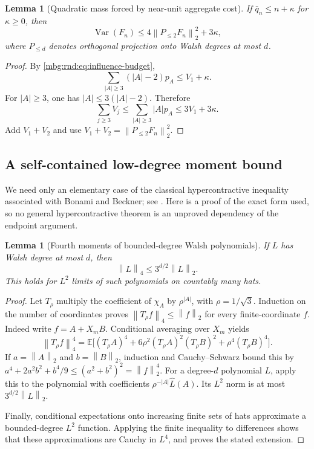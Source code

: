 \documentclass[11pt,letterpaper]{article}
\newtheorem{lemma}[theorem]{Lemma}
\theoremstyle{definition}
\newcommand{\E}{\mathbb E}
\newcommand{\norm}[1]{\left\lVert #1\right\rVert}
\DeclareMathOperator{\Var}{Var}
\begin{document}
\begin{lemma}[Quadratic mass forced by near-unit aggregate cost]
\label{mbg:rnd:lem:energy}
If $\bar q_n\le n+\kappa$ for $\kappa\ge0$, then
\begin{equation}
 \Var(F_n)\le4\norm{P_{\le2}F_n}_{2}^2+3\kappa,
 \label{mbg:rnd:eq:energy}
\end{equation}
where $P_{\le d}$ denotes orthogonal projection onto Walsh degrees at
most $d$.
\end{lemma}
\begin{proof}
By \eqref{mbg:rnd:eq:influence-budget},
\[
 \sum_{|A|\ge3}(|A|-2)p_A\le V_1+\kappa.
\]
For $|A|\ge3$, one has $|A|\le3(|A|-2)$. Therefore
\[
 \sum_{j\ge3}V_j
 \le\sum_{|A|\ge3}|A|p_A\le3V_1+3\kappa.
\]
Add $V_1+V_2$ and use $V_1+V_2=\norm{P_{\le2}F_n}_{2}^2$.
\end{proof}

\subsection{A self-contained low-degree moment bound}

We need only an elementary case of the classical hypercontractive
inequality associated with Bonami and Beckner; see \cite{rnd:Beckner}.
Here is a proof of the exact form used, so no general hypercontractive
theorem is an unproved dependency of the endpoint argument.

\begin{lemma}[Fourth moments of bounded-degree Walsh polynomials]
\label{mbg:rnd:lem:bonami}
If $L$ has Walsh degree at most $d$, then
\begin{equation}
 \norm{L}_{4}\le3^{d/2}\norm{L}_{2}.
 \label{mbg:rnd:eq:bonami}
\end{equation}
This holds for $L^2$ limits of such polynomials on countably many hats.
\end{lemma}
\begin{proof}
Let $T_\rho$ multiply the coefficient of $\chi_A$ by $\rho^{|A|}$,
with $\rho=1/\sqrt3$. Induction on the number of coordinates proves
$\norm{T_\rho f}_{4}\le\norm{f}_{2}$ for every finite-coordinate $f$.
Indeed write $f=A+X_mB$. Conditional averaging over $X_m$ yields
\[
 \norm{T_\rho f}_{4}^4
 =\E\bigl[(T_\rho A)^4+6\rho^2(T_\rho A)^2(T_\rho B)^2
                   +\rho^4(T_\rho B)^4\bigr].
\]
If $a=\norm{A}_{2}$ and $b=\norm{B}_{2}$, induction and Cauchy--Schwarz bound
this by
$a^4+2a^2b^2+b^4/9\le(a^2+b^2)^2=\norm{f}_{2}^4$.
For a degree-$d$ polynomial $L$, apply this to the polynomial with
coefficients $\rho^{-|A|}\widehat L(A)$. Its $L^2$ norm is at most
$3^{d/2}\norm{L}_{2}$.

Finally, conditional expectations onto increasing finite sets of hats
approximate a bounded-degree $L^2$ function. Applying the finite
inequality to differences shows that these approximations are Cauchy
in $L^4$, and proves the stated extension.
\end{proof}
\end{document}
